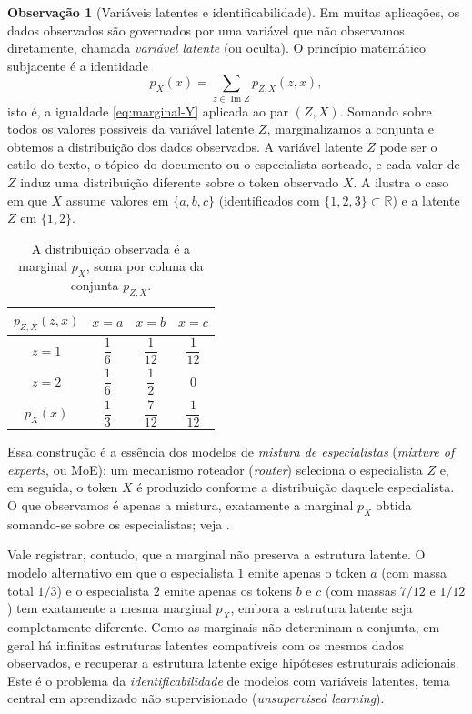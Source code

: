 \documentclass[12pt,portuguese]{article}
\theoremstyle{definition}
\newtheorem{remark}[remark]{Observação}
\begin{document}
\begin{remark}[Variáveis latentes e identificabilidade]\label{rem:variavel-latente}
Em muitas aplicações, os dados observados são governados por uma variável que
não observamos diretamente, chamada \emph{variável latente} (ou oculta). O
princípio matemático subjacente é a identidade
\[
p_{X}(x)
=
\sum_{z\in\operatorname{Im}Z} p_{Z,X}(z,x),
\]
isto é, a igualdade \eqref{eq:marginal-Y} aplicada ao par $(Z,X)$. 
Somando sobre todos os valores possíveis da variável latente $Z$, marginalizamos a
conjunta e obtemos a distribuição dos dados observados. A variável latente $Z$
pode ser o estilo do texto, o tópico do documento ou o especialista sorteado,
e cada valor de $Z$ induz uma distribuição diferente sobre o token observado
$X$. A  ilustra o caso em que $X$ assume valores em
$\{a,b,c\}$ (identificados com $\{1,2,3\}\subset\mathbb{R}$) e a latente $Z$ em
$\{1,2\}$.

\begin{table}[H]
\centering
\renewcommand{\arraystretch}{1.7}
\setlength{\tabcolsep}{18pt}
\begin{tabular}{cccc}
\toprule
$p_{Z,X}(z,x)$ & $x=a$ & $x=b$ & $x=c$ \\
\midrule
$z=1$ & $\dfrac{1}{6}$ & $\dfrac{1}{12}$ & $\dfrac{1}{12}$ \\[9pt]
$z=2$ & $\dfrac{1}{6}$ & $\dfrac{1}{2}$ & $0$ \\[5pt]
\midrule
$p_X(x)$ & $\dfrac{1}{3}$ & $\dfrac{7}{12}$ & $\dfrac{1}{12}$ \\[2pt]
\bottomrule
\end{tabular}
\vspace{0.25cm}
\caption{A distribuição observada é a marginal $p_X$, soma por coluna da conjunta $p_{Z,X}$.}
\label{tab:variavel-latente}
\end{table}

Essa construção é a essência dos modelos de \emph{mistura de especialistas}
(\emph{mixture of experts}, ou MoE): um mecanismo roteador (\emph{router})
seleciona o especialista $Z$ e, em seguida, o token $X$ é produzido conforme a
distribuição daquele especialista. O que observamos é apenas a mistura,
exatamente a marginal $p_X$ obtida somando-se sobre os especialistas; veja
\cite{Shazeer2017}.

Vale registrar, contudo, que a marginal não preserva a estrutura latente. O
modelo alternativo em que o especialista $1$ emite apenas o token $a$ (com
massa total $1/3$) e o especialista $2$ emite apenas os tokens $b$ e $c$ (com
massas $7/12$ e $1/12$) tem exatamente a mesma marginal $p_X$, embora a
estrutura latente seja completamente diferente. Como as marginais não
determinam a conjunta, em geral há infinitas estruturas latentes compatíveis
com os mesmos dados observados, e recuperar a estrutura latente exige hipóteses
estruturais adicionais. Este é o problema da \emph{identificabilidade} de
modelos com variáveis latentes, tema central em aprendizado não
supervisionado (\emph{unsupervised learning}).
\end{remark}
\end{document}
